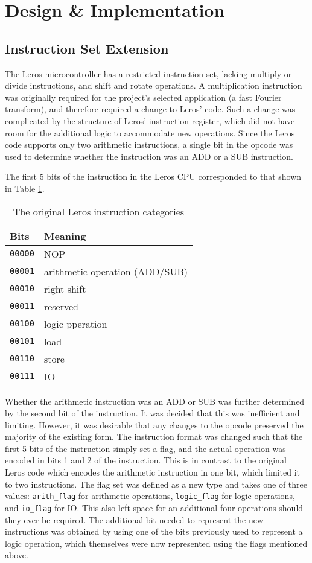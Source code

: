 \section{Design \& Implementation}
\subsection{Instruction Set Extension}

The Leros microcontroller has a restricted instruction set, lacking multiply or
divide instructions, and shift and rotate operations. A multiplication
instruction was originally required for the project's selected application (a
fast Fourier transform), and therefore required a change to Leros' code. Such a
change was complicated by the structure of Leros' instruction register, which
did not have room for the additional logic to accommodate new operations. Since
the Leros code supports only two arithmetic instructions, a single bit in the
opcode was used to determine whether the instruction was an ADD or a SUB
instruction.

The first 5 bits of the instruction in the Leros CPU corresponded to that shown
in Table \ref{tab:original-instruction}.

\begin{table}
\centering
\caption{The original Leros instruction categories}
\label{tab:original-instruction}
\begin{tabular}{|l|l|}
\hline
\textbf{Bits} & Meaning \\
\hline
\texttt{00000} & NOP \\
\texttt{00001} & arithmetic operation (ADD/SUB) \\
\texttt{00010} & right shift \\
\texttt{00011} & reserved \\
\texttt{00100} & logic pperation \\
\texttt{00101} & load \\
\texttt{00110} & store \\
\texttt{00111} & IO \\
\hline
\end{tabular}
\end{table}

Whether the arithmetic instruction was an ADD or SUB was further determined by
the second bit of the instruction. It was decided that this was inefficient and
limiting. However, it was desirable that any changes to the opcode preserved the
majority of the existing form. The instruction format was changed such that the
first 5 bits of the instruction simply set a flag, and the actual operation was
encoded in bits 1 and 2 of the instruction. This is in contrast to the original
Leros code which encodes the arithmetic instruction in one bit, which limited it
to two instructions. The flag set was defined as a new type and takes one
of three values: \texttt{arith\_flag} for arithmetic operations,
\texttt{logic\_flag} for logic operations, and  \texttt{io\_flag} for IO. This
also left space for an additional four operations should they ever be required.
The additional bit needed to represent the new instructions was obtained by
using one of the bits previously used to represent a logic operation, which
themselves were now represented using the flags mentioned above.

